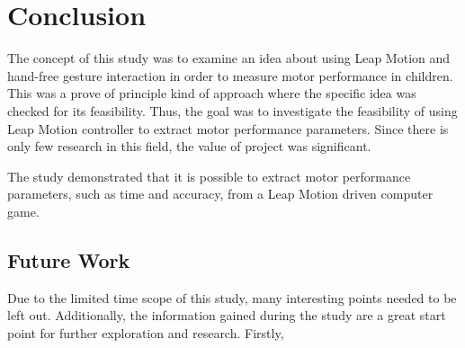 \chapter{Conclusion}
\label{chap:conclusion}



The concept of this study was to examine an idea about using Leap Motion and hand-free gesture interaction in order to measure motor performance in children. This was a prove of principle kind of approach where the specific idea was checked for its feasibility. Thus, the goal was to investigate the feasibility of using Leap Motion controller to extract motor performance parameters. Since there is only few research in this field, the value of project was significant.

The study demonstrated that it is possible to extract motor performance parameters, such as time and accuracy, from a Leap Motion driven computer game. 

\section{Future Work}
\label{sec:future}



Due to the limited time scope of this study, many interesting points needed to be left out. Additionally, the information gained during the study are a great start point for further exploration and research.  
Firstly, 





